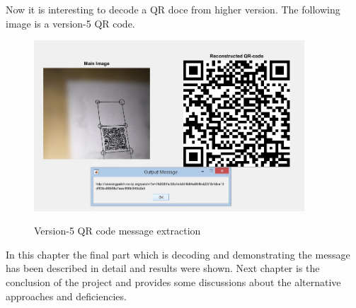 \newpage
Now it is interesting to decode a QR doce from higher version. The following image is a version-5 QR code.

\begin{figure}[H]
  \caption{Version-5 QR code message extraction}
  \centering
    \includegraphics[width=0.9\textwidth]{figures/decod4.jpg}
    \label{fig:4.2}
\end{figure}

In this chapter the final part which is decoding and demonstrating the message has been described in detail and results were shown. Next chapter is the conclusion of the project and provides some discussions about the alternative approaches and deficiencies.
